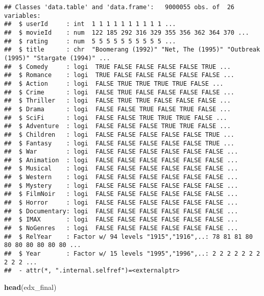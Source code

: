 \documentclass[
]{article}
\newenvironment{Shaded}{\begin{snugshade}}{\end{snugshade}}
\newcommand{\KeywordTok}[1]{\textcolor[rgb]{0.13,0.29,0.53}{\textbf{#1}}}
\newcommand{\NormalTok}[1]{#1}
\begin{document}
\begin{verbatim}
## Classes 'data.table' and 'data.frame':   9000055 obs. of  26 variables:
##  $ userId     : int  1 1 1 1 1 1 1 1 1 1 ...
##  $ movieId    : num  122 185 292 316 329 355 356 362 364 370 ...
##  $ rating     : num  5 5 5 5 5 5 5 5 5 5 ...
##  $ title      : chr  "Boomerang (1992)" "Net, The (1995)" "Outbreak (1995)" "Stargate (1994)" ...
##  $ Comedy     : logi  TRUE FALSE FALSE FALSE FALSE TRUE ...
##  $ Romance    : logi  TRUE FALSE FALSE FALSE FALSE FALSE ...
##  $ Action     : logi  FALSE TRUE TRUE TRUE TRUE FALSE ...
##  $ Crime      : logi  FALSE TRUE FALSE FALSE FALSE FALSE ...
##  $ Thriller   : logi  FALSE TRUE TRUE FALSE FALSE FALSE ...
##  $ Drama      : logi  FALSE FALSE TRUE FALSE TRUE FALSE ...
##  $ SciFi      : logi  FALSE FALSE TRUE TRUE TRUE FALSE ...
##  $ Adventure  : logi  FALSE FALSE FALSE TRUE TRUE FALSE ...
##  $ Children   : logi  FALSE FALSE FALSE FALSE FALSE TRUE ...
##  $ Fantasy    : logi  FALSE FALSE FALSE FALSE FALSE TRUE ...
##  $ War        : logi  FALSE FALSE FALSE FALSE FALSE FALSE ...
##  $ Animation  : logi  FALSE FALSE FALSE FALSE FALSE FALSE ...
##  $ Musical    : logi  FALSE FALSE FALSE FALSE FALSE FALSE ...
##  $ Western    : logi  FALSE FALSE FALSE FALSE FALSE FALSE ...
##  $ Mystery    : logi  FALSE FALSE FALSE FALSE FALSE FALSE ...
##  $ FilmNoir   : logi  FALSE FALSE FALSE FALSE FALSE FALSE ...
##  $ Horror     : logi  FALSE FALSE FALSE FALSE FALSE FALSE ...
##  $ Documentary: logi  FALSE FALSE FALSE FALSE FALSE FALSE ...
##  $ IMAX       : logi  FALSE FALSE FALSE FALSE FALSE FALSE ...
##  $ NoGenres   : logi  FALSE FALSE FALSE FALSE FALSE FALSE ...
##  $ RelYear    : Factor w/ 94 levels "1915","1916",..: 78 81 81 80 80 80 80 80 80 80 ...
##  $ Year       : Factor w/ 15 levels "1995","1996",..: 2 2 2 2 2 2 2 2 2 2 ...
##  - attr(*, ".internal.selfref")=<externalptr>
\end{verbatim}

\begin{Shaded}
\begin{Highlighting}[]
\KeywordTok{head}\NormalTok{(edx_final)}
\end{Highlighting}
\end{Shaded}
\end{document}
